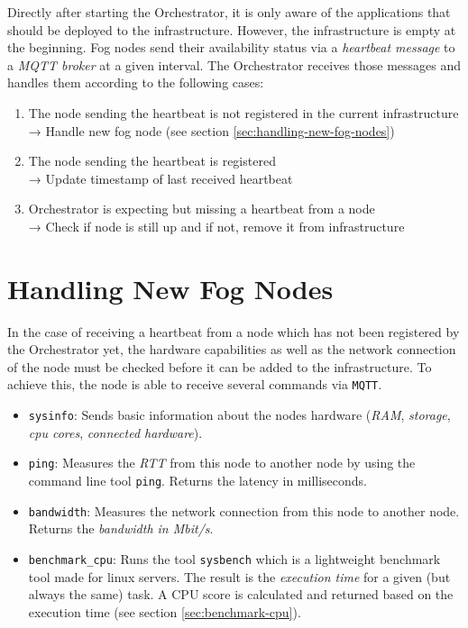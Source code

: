 Directly after starting the Orchestrator, it is only aware of the applications that should be deployed to the infrastructure. However, the infrastructure is empty at the beginning. Fog nodes send their availability status via a \textit{heartbeat message} to a \textit{MQTT broker} at a given interval.
The Orchestrator receives those messages and handles them according to the following cases:
\begin{enumerate}
    \item The node sending the heartbeat is not registered in the current infrastructure\\
    → Handle new fog node (see section \ref{sec:handling-new-fog-nodes})
    \item The node sending the heartbeat is registered\\
    → Update timestamp of last received heartbeat
    \item Orchestrator is expecting but missing a heartbeat from a node\\
    → Check if node is still up and if not, remove it from infrastructure
\end{enumerate}

\section{Handling New Fog Nodes\label{sec:handling-new-fog-nodes}}

In the case of receiving a heartbeat from a node which has not been registered by the Orchestrator yet, the hardware capabilities as well as the network connection of the node must be checked before it can be added to the infrastructure. To achieve this, the node is able to receive several commands via \texttt{MQTT}.

\begin{itemize}
    \item \texttt{sysinfo}: Sends basic information about the nodes hardware (\textit{RAM}, \textit{storage}, \textit{cpu cores}, \textit{connected hardware}).
    \item \texttt{ping}: Measures the \textit{RTT} from this node to another node by using the command line tool \texttt{ping}. Returns the latency in milliseconds.
    \item \texttt{bandwidth}: Measures the network connection from this node to another node. Returns the \textit{bandwidth in Mbit/s}.
    \item \texttt{benchmark\_cpu}: Runs the tool \texttt{sysbench} which is a lightweight benchmark tool made for linux servers. The result is the \textit{execution time} for a given (but always the same) task. A CPU score is calculated and returned based on the execution time (see section \ref{sec:benchmark-cpu}).
\end{itemize}

